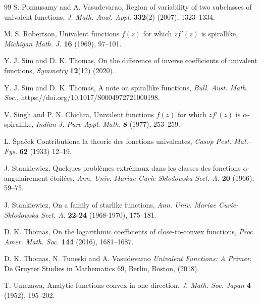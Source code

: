 \documentclass[a4paper,12pt]{amsart}
\theoremstyle{definition}
\numberwithin{equation}{section}
\begin{document}
\begin{thebibliography}{99}
 {\sc S. Ponnusamy} and  {\sc A.  Vasudevarao},
{Region of variability of two subclasses of univalent functions},
{\em J. Math. Anal. Appl.} \textbf{332}(2) (2007), 1323--1334.



  {\sc M. S. Robertson},
{Univalent functions $f(z)$ for which $zf'(z)$ is spirallike,}
{\em Michigan Math. J.} {\bf 16} (1969), 97--101.


 {\sc Y. J. Sim} and {\sc D. K. Thomas},
{On the difference of inverse coefficients of univalent functions,}
{\em Symmetry} \textbf{12}(12) (2020).

 {\sc Y. J. Sim} and {\sc D. K. Thomas},
{A note on spirallike functions,}
{\em Bull. Aust. Math. Soc.},  https://doi.org/10.1017/S0004972721000198.

 {\sc  V. Singh} and {\sc P. N. Chichra},
{Univalent functions $f(z)$ for which $zf'(z)$ is $\alpha$-spirallike},
{\em Indian J. Pure Appl. Math.} {\bf 8} (1977), 253--259.


 {\sc L. Špaček}
{Contributiona la theorie des fonctions univalentes},
{\em Casop Pest. Mat.-Fys.} {\bf 62} (1933) 12--19.

	{\sc J. Stankiewicz}, Quelques problèmes extrémaux dans les classes des fonctions $\alpha$-angulairement étoilées, {\it Ann. Univ. Mariae Curie-Skłodowska Sect. A.} {\bf 20} (1966), 59--75.

	{\sc J. Stankiewicz}, On a family of starlike functions, {\it Ann. Univ. Mariae Curie-Skłodowska Sect. A.} {\bf 22-24} (1968-1970), 175--181.
	
		
{\sc D. K. Thomas}, On the logarithmic coefficients of close-to-convex functions, {\it Proc. Amer. Math. Soc.} {\bf 144} (2016), 1681--1687.

	{\sc D. K. Thomas}, {\sc N. Tuneski} and {\sc A. Vasudevarao} {\it Univalent Functions: A Primer}, De Gruyter Studies in Mathematics 69, Berlin, Boston, (2018).	


 {\sc T. Umezawa,}
{Analytic functions convex in one direction},
{\em J. Math. Soc. Japan} {\bf 4} (1952), 195--202.












	 
\end{thebibliography}
\end{document}
